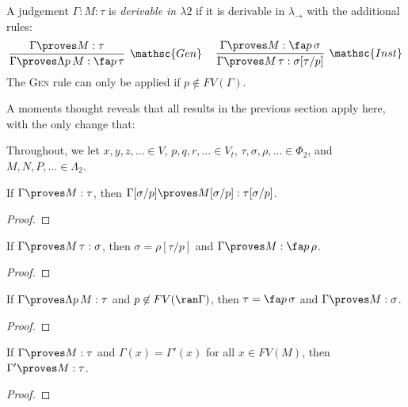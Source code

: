 \documentclass[reqno]{amsart}
\begin{document}
    \begin{definition}
        A judgement $\Gamma:M:\tau$ is \textit{derivable in $\lambda2$} if it is derivable in $\lambda_\rightarrow$ with the additional rules:
        \begin{equation*}
            \infer[\mathsc{Gen}]{\Gamma\proves\Lambda p\,M:\fa p\,\tau}{\Gamma\proves M:\tau}\ \ \ \ 
            \infer[\mathsc{Inst}]{\Gamma\proves M\,\tau:\sigma[\tau/p]}{\Gamma\proves M:\fa p\,\sigma}
        \end{equation*}
        The \textsc{Gen} rule can only be applied if $p\not\in FV(\Gamma)$.
    \end{definition}

    A moments thought reveals that all results in the previous section apply here, with the only change that:

    \begin{notation}
        Throughout, we let $x,y,z,\ldots\in V$, $p,q,r,\ldots\in V_t$, $\tau,\sigma,\rho,\ldots\in\Phi_2$, and $M,N,P,\ldots\in\Lambda_2$.
    \end{notation}

    \begin{lemma}\label{lem:polymorphic_variable_substitution}
        If $\Gamma\proves M:\tau$, then $\Gamma[\sigma/p]\proves M[\sigma/p]:\tau[\sigma/p]$.
    \end{lemma}
    \begin{proof}
        \TODO
    \end{proof}

    \begin{lemma}\label{lem:polymorphic_generation_1}
        If $\Gamma\proves M\,\tau:\sigma$, then $\sigma=\rho[\tau/p]$ and $\Gamma\proves M:\fa p\,\rho$.
    \end{lemma}
    \begin{proof}
        \TODO
    \end{proof}

    \begin{lemma}\label{lem:polymorphic_generation_2}
        If $\Gamma\proves\Lambda p\,M:\tau$ and $p\not\in FV(\ran\Gamma)$, then $\tau=\fa p\,\sigma$ and $\Gamma\proves M:\sigma$.
    \end{lemma}
    \begin{proof}
        \TODO
    \end{proof}

    \begin{lemma}\label{lem:polymorphic_change_of_context}
        If $\Gamma\proves M:\tau$ and $\Gamma(x)=\Gamma'(x)$ for all $x\in FV(M)$, then $\Gamma'\proves M:\tau$.
    \end{lemma}
    \begin{proof}
        \TODO
    \end{proof}
\end{document}
